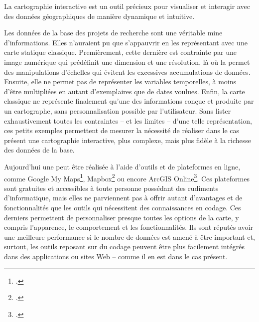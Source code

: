 La cartographie interactive est un outil précieux pour visualiser et interagir avec des données géographiques de manière dynamique et intuitive. \par
Les données de la base des projets de recherche sont une véritable mine d’informations. Elles n’auraient pu que s’appauvrir en les représentant avec une carte statique classique. Premièrement, cette dernière est contrainte par une image numérique qui prédéfinit une dimension et une résolution, là où la  permet des manipulations d’échelles qui évitent les excessives accumulations de données. Ensuite, elle ne permet pas de représenter les variables temporelles, à moins d’être multipliées en autant d’exemplaires que de dates voulues. Enfin, la carte classique ne représente finalement qu’une  des informations conçue et produite par un cartographe, sans personnalisation possible par l’utilisateur. Sans lister exhaustivement toutes les contraintes – et les limites – d’une telle représentation, ces petits exemples permettent de mesurer la nécessité de réaliser dans le cas présent une cartographie interactive, plus  complexe, mais plus fidèle à la richesse des données de la base.\\\par
Aujourd’hui une  peut être réalisée à l’aide d’outils et de plateformes en ligne, comme Google My Maps\footcite{noauthor_google_nodate}, Mapbox\footcite{noauthor_mapbox_nodate} ou encore ArcGIS Online\footcite{noauthor_arcgis_nodate}. Ces plateformes sont gratuites et accessibles à toute personne possédant des rudiments d’informatique, mais elles ne parviennent pas à offrir autant d’avantages et de fonctionnalités que les outils qui nécessitent des connaissances en codage. Ces derniers permettent de personnaliser presque toutes les options de la carte, y compris l’apparence, le comportement et les fonctionnalités. Ils sont réputés avoir une meilleure performance si le nombre de données est amené à être important et, surtout, les outils reposant sur du codage peuvent être plus facilement intégrés dans des applications ou sites Web – comme il en est dans le cas présent. 
